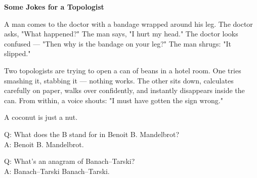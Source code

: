 \vspace*{\fill}
\begin{center}
\begin{minipage}{0.8\textwidth}
\begin{tcolorbox}[colback=gray!10!white, colframe=black!50!white, sharp corners, boxrule=0.3pt, width=0.9\textwidth, enhanced]
\small
\textbf{Some Jokes for a Topologist}

A man comes to the doctor with a bandage wrapped around his leg. The doctor asks, "What happened?" The man says, "I hurt my head." The doctor looks confused — "Then why is the bandage on your leg?" The man shrugs: "It slipped."

\vspace{1em}

Two topologists are trying to open a can of beans in a hotel room. One tries smashing it, stabbing it — nothing works. The other sits down, calculates carefully on paper, walks over confidently, and instantly disappears inside the can. From within, a voice shouts: "I must have gotten the sign wrong."

\vspace{1em}

A coconut is just a nut.

\vspace{1em}

Q: What does the B stand for in Benoit B. Mandelbrot?\\
A: Benoit B. Mandelbrot.

\vspace{1em}

Q: What's an anagram of Banach–Tarski?\\
A: Banach–Tarski Banach–Tarski.
\end{tcolorbox}
\end{minipage}
\end{center}
\vspace*{\fill}

